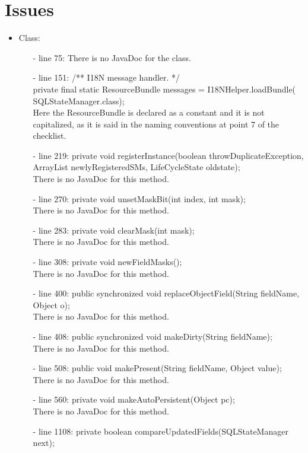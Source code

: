 \documentclass[18pt,oneside,a4paper, titlepage]{article}
\begin{document}
\section{Issues}
	\begin{itemize}
		\item Class:
			\begin{itemize}
				\item[-] line 75: There is no JavaDoc for the class.
				\item[-] line 151: /** I18N message handler. */\\
				private final static ResourceBundle messages = I18NHelper.loadBundle(
				SQLStateManager.class);\\
				Here the ResourceBundle is declared as a constant and it is not capitalized, as it is said in the naming conventions at point 7 of the checklist.
				\item[-] line 219: private void registerInstance(boolean throwDuplicateException,
				ArrayList newlyRegisteredSMs, LifeCycleState oldstate);\\
				There is no JavaDoc for this method.
				\item[-] line 270: private void unsetMaskBit(int index, int mask);\\
				There is no JavaDoc for this method.
				\item[-] line 283: private void clearMask(int mask);\\
				There is no JavaDoc for this method.
				\item[-] line 308: private void newFieldMasks();\\
				There is no JavaDoc for this method.
				\item[-] line 400: public synchronized void replaceObjectField(String fieldName, Object o);\\
				There is no JavaDoc for this method.
				\item[-] line 408: public synchronized void makeDirty(String fieldName);
				\\There is no JavaDoc for this method.
				\item[-] line 508: public void makePresent(String fieldName, Object value);
				\\There is no JavaDoc for this method.
				\item[-] line 560: private void makeAutoPersistent(Object pc);
				\\There is no JavaDoc for this method.
				\item[-] line 1108: private boolean compareUpdatedFields(SQLStateManager next);

\end{itemize}
\end{itemize}
\end{document}
